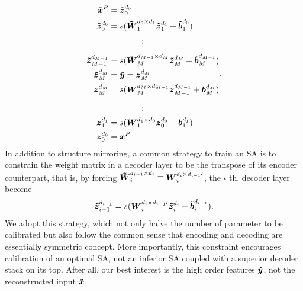 \begin{equation} \label{eq:ED}
\begin{split}
  \xDC^P &= \zDI{0}{0} \\
  \zDI{0  }{0  } &= s(\WDI{1  }{0  }{1  } \zDI{1  }{1  } + \bDI{1}{0  }) \\
  & \quad \quad \quad \quad \vdots \\
  \zDI{M-1}{M-1} &= s(\WDI{M  }{M-1}{M  } \zDI{M  }{M  } + \bDI{M}{M-1}) \\
  \zDI{M  }{M  } &= \yHT = \zEI{M}{M} \\
  \zEI{M  }{M  } &= s(\WEI{M  }{M  }{M-1} \zEI{M-1}{M-1} + \bEI{M}{M  }) \\
  & \quad \quad \quad \quad \vdots \\
  \zEI{1  }{1  } &= s(\WEI{1  }{1  }{0  } \zEI{0  }{0  } + \bEI{1}{1  }) \\
  \zEI{0  }{0  } &= \xEC^P
\end{split}.
\end{equation}
In addition to structure mirroring, a common strategy to train an SA is to constrain the weight matrix in a decoder layer to be the transpose of its encoder counterpart, that is, by forcing $\WDI{i}{i-1}{i} \equiv \WEIt{i}{i}{i-1}$, the $i$ th. decoder layer become
\begin{equation} \label{eq:CW}
  \zDI{i-1}{i-1} = s(\WEIt{i}{i}{i-1} \zDI{i  }{i  } + \bDI{i  }{i-1}).
\end{equation}
We adopt this strategy, which not only halve the number of parameter to be calibrated but also follow the common sense that encoding and decoding are essentially symmetric concept. More importantly, this constraint encourages calibration of an optimal SA, not an inferior SA coupled with a superior decoder stack on its top. After all, our best interest is the high order features $\yHT$, not the reconstructed input $\xDC$.

